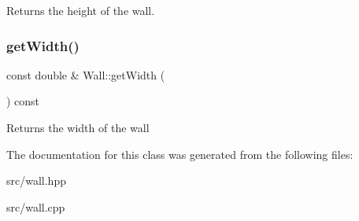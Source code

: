 Returns the height of the wall. \hypertarget{classWall_a98f9c3ef8a89ee2622e1cf84df093a2d}{}\label{classWall_a98f9c3ef8a89ee2622e1cf84df093a2d} 
\subsubsection{\texorpdfstring{get\+Width()}{getWidth()}}
{\footnotesize\ttfamily const double \& Wall\+::get\+Width (\begin{DoxyParamCaption}{ }\end{DoxyParamCaption}) const}

Returns the width of the wall 

The documentation for this class was generated from the following files\+:\begin{DoxyCompactItemize}
\item 
src/wall.\+hpp\item 
src/wall.\+cpp\end{DoxyCompactItemize}

